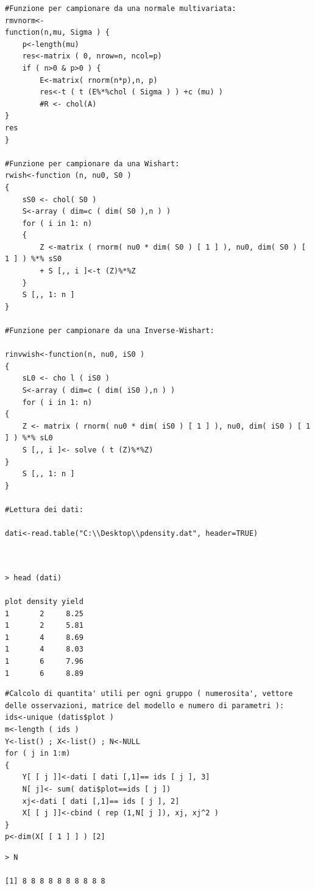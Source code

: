 \begin{lstlisting}[style=R]
#Funzione per campionare da una normale multivariata:
rmvnorm<-
function(n,mu, Sigma ) {
    p<-length(mu)
    res<-matrix ( 0, nrow=n, ncol=p)
    if ( n>0 & p>0 ) {
        E<-matrix( rnorm(n*p),n, p)
        res<-t ( t (E%*%chol ( Sigma ) ) +c (mu) )
        #R <- chol(A)
}
res
}

#Funzione per campionare da una Wishart:
rwish<-function (n, nu0, S0 )
{
    sS0 <- chol( S0 )
    S<-array ( dim=c ( dim( S0 ),n ) )
    for ( i in 1: n)
    {
        Z <-matrix ( rnorm( nu0 * dim( S0 ) [ 1 ] ), nu0, dim( S0 ) [ 1 ] ) %*% sS0
        + S [,, i ]<-t (Z)%*%Z
    }
    S [,, 1: n ]
}

#Funzione per campionare da una Inverse-Wishart:

rinvwish<-function(n, nu0, iS0 )
{
    sL0 <- cho l ( iS0 )
    S<-array ( dim=c ( dim( iS0 ),n ) )
    for ( i in 1: n)
{
    Z <- matrix ( rnorm( nu0 * dim( iS0 ) [ 1 ] ), nu0, dim( iS0 ) [ 1 ] ) %*% sL0
    S [,, i ]<- solve ( t (Z)%*%Z)
}
    S [,, 1: n ]
}

#Lettura dei dati:

dati<-read.table("C:\\Desktop\\pdensity.dat", header=TRUE)



\end{lstlisting}
{
\color{red}
\begin{Verbatim}
> head (dati)

plot density yield
1       2     8.25
1       2     5.81
1       4     8.69
1       4     8.03
1       6     7.96
1       6     8.89
\end{Verbatim}
}

\begin{lstlisting}[style=R]
#Calcolo di quantita' utili per ogni gruppo ( numerosita', vettore delle osservazioni, matrice del modello e numero di parametri ):
ids<-unique (datis$plot )
m<-length ( ids )
Y<-list() ; X<-list() ; N<-NULL
for ( j in 1:m)
{
    Y[ [ j ]]<-dati [ dati [,1]== ids [ j ], 3]
    N[ j]<- sum( dati$plot==ids [ j ])
    xj<-dati [ dati [,1]== ids [ j ], 2]
    X[ [ j ]]<-cbind ( rep (1,N[ j ]), xj, xj^2 )
}
p<-dim(X[ [ 1 ] ] ) [2]

\end{lstlisting}

{
\color{red}
\begin{verbatim}
> N

[1] 8 8 8 8 8 8 8 8 8 8
\end{verbatim}
}

